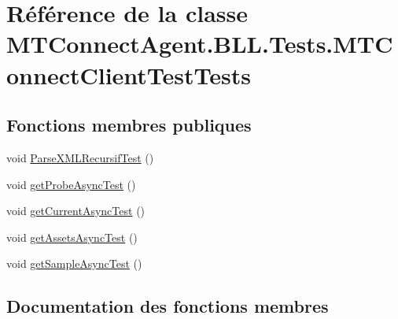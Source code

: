 \hypertarget{class_m_t_connect_agent_1_1_b_l_l_1_1_tests_1_1_m_t_connect_client_test_tests}{}\section{Référence de la classe M\+T\+Connect\+Agent.\+B\+L\+L.\+Tests.\+M\+T\+Connect\+Client\+Test\+Tests}
\label{class_m_t_connect_agent_1_1_b_l_l_1_1_tests_1_1_m_t_connect_client_test_tests}
\subsection*{Fonctions membres publiques}
\begin{DoxyCompactItemize}
\item 
void \mbox{\hyperlink{class_m_t_connect_agent_1_1_b_l_l_1_1_tests_1_1_m_t_connect_client_test_tests_a91266681f0ac346817b804f3cf02f538}{Parse\+X\+M\+L\+Recursif\+Test}} ()
\item 
void \mbox{\hyperlink{class_m_t_connect_agent_1_1_b_l_l_1_1_tests_1_1_m_t_connect_client_test_tests_a86a02e0d46428468dba6b77d85e65d19}{get\+Probe\+Async\+Test}} ()
\item 
void \mbox{\hyperlink{class_m_t_connect_agent_1_1_b_l_l_1_1_tests_1_1_m_t_connect_client_test_tests_a7d01ffc1700c8c123617b37725cd9b22}{get\+Current\+Async\+Test}} ()
\item 
void \mbox{\hyperlink{class_m_t_connect_agent_1_1_b_l_l_1_1_tests_1_1_m_t_connect_client_test_tests_a6d09e49e8d0883a79843b849f7adc3c9}{get\+Assets\+Async\+Test}} ()
\item 
void \mbox{\hyperlink{class_m_t_connect_agent_1_1_b_l_l_1_1_tests_1_1_m_t_connect_client_test_tests_a07b77008a2acf90d32cc2b96e78a5aae}{get\+Sample\+Async\+Test}} ()
\end{DoxyCompactItemize}


\subsection{Documentation des fonctions membres}
\mbox{\label{class_m_t_connect_agent_1_1_b_l_l_1_1_tests_1_1_m_t_connect_client_test_tests_a6d09e49e8d0883a79843b849f7adc3c9}} 
